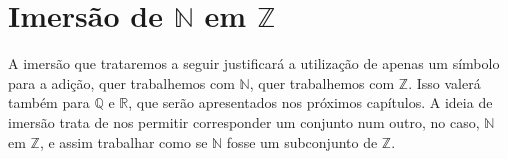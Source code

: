 \documentclass[../main.tex]{subfiles}
\begin{document}

\section{Imersão de $\mathbb{N}$ em $\mathbb{Z}$}
A imersão que trataremos a seguir justificará a utilização de apenas um símbolo para a adição, quer trabalhemos com $\mathbb{N}$, quer trabalhemos com $\mathbb{Z}$. Isso valerá também para $\mathbb{Q}$ e $\mathbb{R}$, que serão apresentados nos próximos capítulos. A ideia de imersão trata de nos permitir corresponder um conjunto num outro, no caso, $\mathbb{N}$ em $\mathbb{Z}$, e assim trabalhar como se $\mathbb{N}$ fosse um subconjunto de $\mathbb{Z}$.
\end{document}
